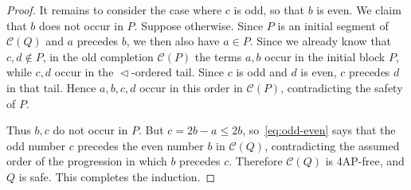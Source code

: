 \documentclass[10pt,a4paper]{amsart}
\newcommand{\C}[1]{\mathcal C(#1)}
\newcommand{\bits}{\mathrel{\triangleleft}}
\begin{document}
\begin{proof}
It remains to consider the case where $c$ is odd, so that $b$ is even. We claim
that $b$ does not occur in $P$. Suppose otherwise. Since $P$ is an initial
segment of $\C Q$ and $a$ precedes $b$, we then also have $a\in P$. Since we
already know that $c,d\notin P$, in the old completion $\C P$ the terms $a,b$
occur in the initial block $P$, while $c,d$ occur in the $\bits$-ordered tail.
Since $c$ is odd and $d$ is even, $c$ precedes $d$ in that tail. Hence $a,b,c,d$
occur in this order in $\C P$, contradicting the safety of $P$.

Thus $b,c$ do not occur in $P$. But $c=2b-a\le2b$, so~\eqref{eq:odd-even} says
that the odd number $c$ precedes the even number $b$ in $\C Q$, contradicting
the assumed order of the progression in which $b$ precedes $c$.
Therefore $\C Q$ is 4AP-free, and $Q$ is safe. This completes the induction.
\end{proof}
\end{document}

